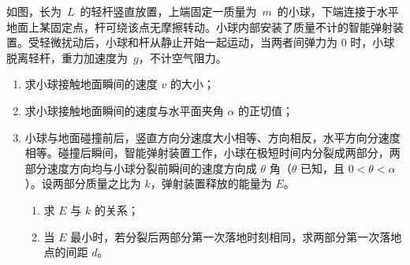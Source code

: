 \begin{question}
如图，长为~$L$~的轻杆竖直放置，上端固定一质量为~$m$~的小球，下端连接于水平地面上某固定点，杆可绕该点无摩擦转动。小球内部安装了质量不计的智能弹射装置。受轻微扰动后，小球和杆从静止开始一起运动，当两者间弹力为 0 时，小球脱离轻杆，重力加速度为~$g$，不计空气阻力。


\begin{enumerate}[leftmargin=2em, label=(\arabic*)]
  \item 求小球接触地面瞬间的速度 $v$ 的大小；
  \item 求小球接触地面瞬间的速度与水平面夹角 $\alpha$ 的正切值；
  \item 小球与地面碰撞前后，竖直方向分速度大小相等、方向相反，水平方向分速度相等。碰撞后瞬间，智能弹射装置工作，小球在极短时间内分裂成两部分，两部分速度方向均与小球分裂前瞬间的速度方向成 $\theta$ 角（$\theta$ 已知，且 $0<\theta<\alpha$）。设两部分质量之比为 $k$，弹射装置释放的能量为 $E$。
        \begin{enumerate}[leftmargin=2em, label=(\roman*)]
          \item 求 $E$ 与 $k$ 的关系；
          \item 当 $E$ 最小时，若分裂后两部分第一次落地时刻相同，求两部分第一次落地点的间距 $d$。
        \end{enumerate}
\end{enumerate}
\end{question}
